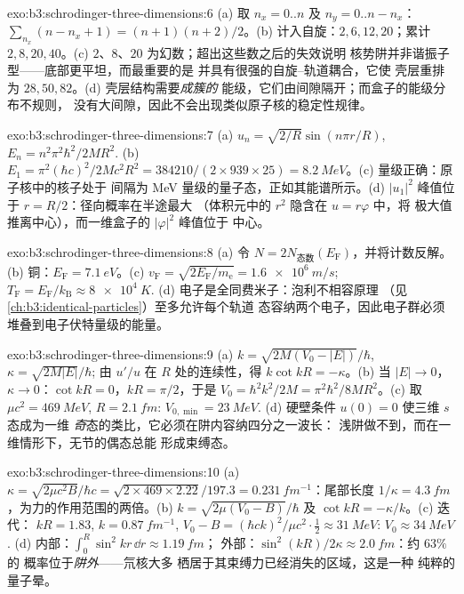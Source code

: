 \begin{solution}{exo:b3:schrodinger-three-dimensions:6}
(a) 取 $n_x = 0..n$ 及 $n_y = 0..n - n_x$：$\sum_{n_x}(n - n_x
+ 1) = (n+1)(n+2)/2$。(b) 计入自旋：$2, 6, 12, 20$；累计 $2,
8, 20, 40$。(c) $2$、$8$、$20$ 为幻数；超出这些数之后的失效说明
核势阱并非谐振子型——底部更平坦，而最重要的是
并具有很强的自旋–轨道耦合，它使
壳层重排为 $28, 50, 82$。(d) 壳层结构需要\emph{成簇的}
能级，它们由间隙隔开；而盒子的能级分布不规则，
没有大间隙，因此不会出现类似原子核的稳定性规律。
\end{solution}

\begin{solution}{exo:b3:schrodinger-three-dimensions:7}
(a) $u_n = \sqrt{2/R}\sin(n\pi r/R)$, $E_n = n^2\pi^2\hbar^2/2MR^2$.
(b) $E_1 = \pi^2(\hbar c)^2/2Mc^2R^2 = 384210/(2 \times 939 \times
25) = \qty{8.2}{MeV}$。(c) 量级正确：原子核中的核子处于
间隔为 MeV 量级的量子态，正如其能谱所示。(d) $|u_1|^2$
峰值位于 $r = R/2$：径向概率在半途最大
（体积元中的 $r^2$ 隐含在 $u = r\varphi$ 中，将
极大值推离中心），而一维盒子的 $|\varphi|^2$ 峰值位于
中心。
\end{solution}

\begin{solution}{exo:b3:schrodinger-three-dimensions:8}
(a) 令 $N = 2N_{\text{态数}}(E_{\text{F}})$，并将计数反解。
(b) 铜：$E_{\text{F}} = \qty{7.1}{eV}$。(c) $v_{\text{F}} =
\sqrt{2E_{\text{F}}/m_{\text{e}}} = \qty{1.6e6}{m/s}$;
$T_{\text{F}} = E_{\text{F}}/k_{\text{B}} \approx \qty{8e4}{K}$. (d)
电子是全同费米子：泡利不相容原理
（见\cref{ch:b3:identical-particles}）至多允许每个轨道
态容纳两个电子，因此电子群必须堆叠到电子伏特量级的能量。
\end{solution}

\begin{solution}{exo:b3:schrodinger-three-dimensions:9}
(a) $k = \sqrt{2M(V_0 - |E|)}/\hbar$, $\kappa = \sqrt{2M|E|}/\hbar$;
由 $u'/u$ 在 $R$ 处的连续性，得 $k\cot kR = -\kappa$。(b) 当 $|E|
\to 0$，$\kappa \to 0$：$\cot kR = 0$，$kR = \pi/2$，于是 $V_0 =
\hbar^2k^2/2M = \pi^2\hbar^2/8MR^2$。(c) 取 $\mu c^2 =
\qty{469}{MeV}$, $R = \qty{2.1}{fm}$: $V_{0,\min} = \qty{23}{MeV}$.
(d) 硬壁条件 $u(0) = 0$ 使三维 $s$ 态成为一维
\emph{奇}态的类比，它必须在阱内容纳四分之一波长：
浅阱做不到，而在一维情形下，无节的偶态总能
形成束缚态。
\end{solution}

\begin{solution}{exo:b3:schrodinger-three-dimensions:10}
(a) $\kappa = \sqrt{2\mu c^2B}/\hbar c = \sqrt{2 \times 469 \times
2.22}/197.3 = \qty{0.231}{fm^{-1}}$：尾部长度 $1/\kappa =
\qty{4.3}{fm}$，为力的作用范围的两倍。(b) $k =
\sqrt{2\mu(V_0 - B)}/\hbar$ 及 $\cot kR = -\kappa/k$。(c) 迭代：
$kR = 1.83$, $k = \qty{0.87}{fm^{-1}}$, $V_0 - B = (\hbar ck)^2/\mu
c^2\cdot\tfrac12 \approx \qty{31}{MeV}$: $V_0 \approx \qty{34}{MeV}$.
(d) 内部：$\int_0^R\sin^2kr\,\dd r \approx \qty{1.19}{fm}$；
外部：$\sin^2(kR)/2\kappa \approx \qty{2.0}{fm}$：约 $63\%$ 的
概率位于\emph{阱外}——氘核大多
栖居于其束缚力已经消失的区域，这是一种
纯粹的量子晕。
\end{solution}

